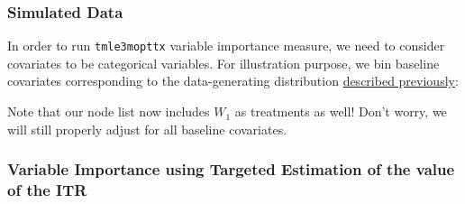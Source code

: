 \documentclass[12pt, krantz2,]{krantz}
\newenvironment{Shaded}{\begin{snugshade}}{\end{snugshade}}
\newcommand{\CommentTok}[1]{\textcolor[rgb]{0.37,0.37,0.37}{\textit{#1}}}
\newcommand{\DataTypeTok}[1]{\textcolor[rgb]{0.27,0.27,0.27}{#1}}
\newcommand{\DecValTok}[1]{\textcolor[rgb]{0.06,0.06,0.06}{#1}}
\newcommand{\KeywordTok}[1]{\textcolor[rgb]{0.27,0.27,0.27}{\textbf{#1}}}
\newcommand{\NormalTok}[1]{#1}
\newcommand{\OperatorTok}[1]{\textcolor[rgb]{0.43,0.43,0.43}{\textbf{#1}}}
\newcommand{\StringTok}[1]{\textcolor[rgb]{0.5,0.5,0.5}{#1}}
\theoremstyle{definition}
\theoremstyle{definition}
\theoremstyle{definition}
\newcommand{\1}{\mathbbm{1}}
\begin{document}
\hypertarget{simulated-data-2}{%
\subsubsection{Simulated Data}\label{simulated-data-2}}

In order to run \texttt{tmle3mopttx} variable importance measure, we need to consider
covariates to be categorical variables. For illustration purpose, we bin
baseline covariates corresponding to the data-generating distribution
\protect\hyperlink{oit-eval}{described previously}:

\begin{Shaded}
\end{Shaded}

Note that our node list now includes \(W_1\) as treatments as well! Don't worry,
we will still properly adjust for all baseline covariates.

\hypertarget{variable-importance-using-targeted-estimation-of-the-value-of-the-itr}{%
\subsubsection{Variable Importance using Targeted Estimation of the value of the ITR}\label{variable-importance-using-targeted-estimation-of-the-value-of-the-itr}}
\end{document}
